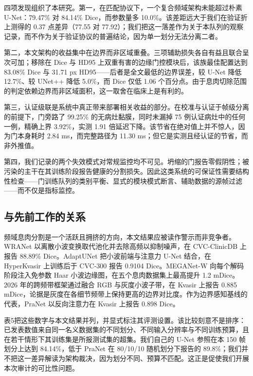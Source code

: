 \documentclass[conference]{IEEEtran}
\begin{document}
四项发现组织了本研究。第一，在匹配协议下，一个复合频域架构未能超过朴素 U-Net：79.47\% 对 84.14\% Dice，而参数量多 10.0\%。该差距远大于我们在验证折上测得的 0.37 点差异（77.55 对 77.92）；我们把这一落差作为关于本队列的观察记录，而不作为关于验证协议的普遍结论，因为单一划分无法分离二者。

第二，本文架构的收益集中在边界而非区域重叠。三项辅助损失各自有益且联合呈次可加；移除在 Dice 与 HD95 上双重有害的边缘门控模块后，该族最佳配置达到 83.08\% Dice 与 31.71 px HD95——后者是全文最低的边界误差，较 U-Net 降低 12.7\%、较 UNet++ 降低 5.0\%，而 Dice 仅低 1.06 个百分点。由于息肉切除范围的判定依赖边界而非区域面积，这一取舍在临床上是有利的。

第三，认证级联是系统中真正带来部署相关收益的部分。在校准与认证于帧级分离的前提下，门旁路了 99.25\% 的无病灶黏膜，同时未漏掉 75 例认证病灶中的任何一例，精确上界 3.92\%，实测 1.91 倍延迟下降。该节省在绝对值上并不惊人，因为门本身耗时 2.84 ms，而完整路径为 11.30 ms；但它是实测且经认证的节省，而非外推值。

第四，我们记录的两个失效模式对常规监控均不可见。坍缩的门报告零假阴性；被污染的主干在其训练阶段报告健康的分割损失。因此这类系统的可保证性需要结构性检查——门训练队列的类别平衡、显式的模块模式断言、辅助数据的源帧过滤——而不仅是指标监控。

\subsection{与先前工作的关系}

频域息肉分割是一个活跃且拥挤的方向，本文结果应被读作警示而非竞争者。WRANet 以离散小波变换取代池化并去除高频以抑制噪声，在 CVC-ClinicDB 上报告 88.89\% Dice\cite{zhao2023wranet}。AdaptUNet 把小波前端与注意力 U-Net 结合，在 HyperKvasir 上训练后于 CVC-300 报告 0.9104 Dice\cite{rajasekar2024adaptunet}。MEGANet-W 向每个解码阶段注入免参数 Haar 小波边缘图，在五个息肉数据集上最高提升 1.2 mDice\cite{yeemeganet2025}。2026 年的跨频带框架通过融合 RGB 与灰度小波子带，在 Kvasir 上报告 0.885 mDice，论据是灰度在各细节频带上保持更高的边界对比度\cite{oh2026crossband}。作为边界感知基线的代表，PraNet 以反向注意力在 Kvasir 上报告 0.898 Dice\cite{fan2020pranet}。

表5把这些数字与本文结果并列，并显式标注其评测设置。该比较刻意不是排序：已发表数值来自同一名义数据集的不同划分、不同输入分辨率与不同训练预算，且在若干情形下其训练集是所报测试集的超集。我们自己的 U-Net 参照在本 150 帧划分上达到 84.14\%，低于 PraNet 在 80/10/10 随机划分下报告的 89.8\%\cite{fan2020pranet}；我们并不把这一差异解读为架构裁决，因为划分不同、预算不匹配。这正是促使我们开展本次审计的可比性问题。
\end{document}
